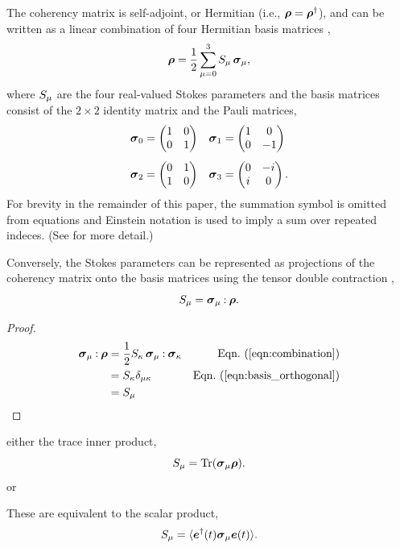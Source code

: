 The coherency matrix is self-adjoint, or Hermitian (i.e., $\mbox{\boldmath $\rho$}=\mbox{\boldmath $\rho$}^\dagger$), and can be written as a linear combination of four Hermitian basis matrices \citep[e.g.,][]{fan57},
%
\begin{equation}
  \mbox{\boldmath $\rho$} = \frac{1}{2} \sum_{\mu=0}^{3} S_\mu\,\mbox{\boldmath $\sigma$}_{\mu},    \label{eqn:combination}
\end{equation}
where $S_\mu$ are the four real-valued Stokes parameters
and the basis matrices consist of the $2\times2$ identity matrix 
and the Pauli matrices,
\begin{equation}
\begingroup
\setlength\arraycolsep{5pt}
\begin{array}{ll}
\pauli{0} = \pauliI
&
\pauli{1} = \pauliQ
\\ [5mm]
\pauli{2} = \pauliU
&
\pauli{3} = \pauliV.
\end{array}
\endgroup
\label{eqn:Pauli}
\end{equation}
%
For brevity in the remainder of this paper, 
the summation symbol is omitted from equations and
Einstein notation is used to imply a sum over repeated indeces.
(See  for more detail.)

Conversely, the Stokes parameters can be represented as projections of the coherency matrix onto the basis matrices using 
the tensor double contraction ,
%
\begin{equation}
S_\mu = {\mbox{\boldmath $\sigma$}_{\mu}}\mathbin{:}{\mbox{\boldmath $\rho$}}.    \label{eqn:Stokes_contraction}
\end{equation}
%

\begin{proof}
\begin{align*}
\dc{\pauli{\irow}}{\cohM{\rho}} 
& = \frac{1}{2} S_\jrow \, \dc{\pauli{\irow}}{\pauli{\jrow}}
    & \peqn{combination} \\
&= S_\jrow \delta_{\irow\jrow} & \peqn{basis_orthogonal} \\
&= S_\irow 
\end{align*}
\end{proof}


\iffalse

either the trace inner product,
%
\begin{equation}
S_\mu = {\rm Tr}(\mbox{\boldmath $\sigma$}_{\mu}\mbox{\boldmath $\rho$}).  \label{eqn:Stokes_trace}
\end{equation}
%
or 

These are equivalent to the scalar product,
%
\begin{equation}
S_\mu = \langle \mbox{\boldmath $e$}^\dagger(t) \mbox{\boldmath $\sigma$}_{\mu} \mbox{\boldmath $e$}(t) \rangle.
\label{eqn:Stokes_scalar}
\end{equation}

